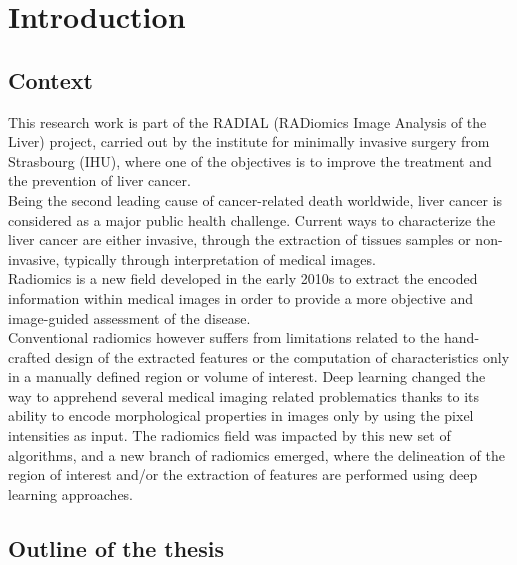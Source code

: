 \chapter*{Introduction}
\label{cha:Introduction}

\section*{Context}
\label{sec:Context}

This research work is part of the RADIAL (RADiomics Image Analysis of the Liver) project, carried out by the
institute for minimally invasive surgery from Strasbourg (IHU), where
one of the objectives is to improve the treatment and the prevention of
liver cancer.\\
Being the second leading cause of cancer-related death worldwide, liver
cancer is considered as a major public health challenge. Current ways to characterize the liver cancer are either invasive, 
through the extraction of tissues samples or non-invasive, typically 
through interpretation of medical images.\\
Radiomics is a new field developed in the early 2010s to extract the encoded information within medical images in order to provide a more objective and image-guided assessment of the disease.\\
Conventional radiomics however suffers from limitations related to the hand-crafted design of the extracted features or the computation of characteristics only in a manually defined region or volume of interest. Deep learning changed the way to apprehend several medical imaging related problematics thanks to its ability to encode
morphological properties in images only by using the pixel intensities
as input. The radiomics field was impacted by this new set of algorithms, and a new branch of radiomics emerged, where the delineation of the region of interest and/or the extraction of features are performed using deep learning approaches.

\section*{Outline of the thesis}
\label{sec:Outline}

